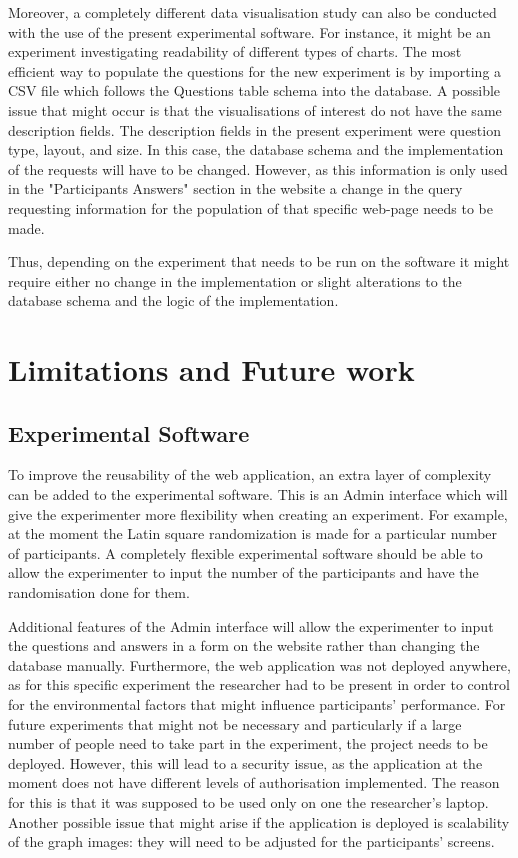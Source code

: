 \documentclass{l4proj}
\begin{document}
Moreover, a completely different data visualisation study can also be conducted with the use of the present experimental software. For instance, it might be an experiment investigating readability of different types of charts. The most efficient way to populate the questions for the new experiment is by importing a CSV file which follows the Questions table schema into the database. A possible issue that might occur is that the visualisations of interest do not have the same description fields. The description fields in the present experiment were question type, layout, and size. In this case, the database schema and the implementation of the requests will have to be changed. However, as this information is only used in the "Participants Answers" section in the website a change in the query requesting information for the population of that specific web-page needs to be made.  

Thus, depending on the experiment that needs to be run on the software it might require either no change in the implementation or slight alterations to the database schema and the logic of the implementation.

\section{Limitations and Future work}

\subsection{Experimental Software}

To improve the reusability of the web application, an extra layer of complexity can be added to the experimental software. This is an Admin interface which will give the experimenter more flexibility when creating an experiment. For example, at the moment the Latin square randomization is made for a particular number of participants. A completely flexible experimental software should be able to allow the experimenter to input the number of the participants and have the randomisation done for them.

Additional features of the Admin interface will allow the experimenter to input the questions and answers in a form on the website rather than changing the database manually. Furthermore, the web application was not deployed anywhere, as for this specific experiment the researcher had to be present in order to control for the environmental factors that might influence participants' performance. For future experiments that might not be necessary and particularly if a large number of people need to take part in the experiment, the project needs to be deployed. However, this will lead to a security issue, as the application at the moment does not have different levels of authorisation implemented. The reason for this is that it was supposed to be used only on one the researcher's laptop. Another possible issue that might arise if the application is deployed is scalability of the graph images: they will need to be adjusted for the participants' screens. 
\end{document}
